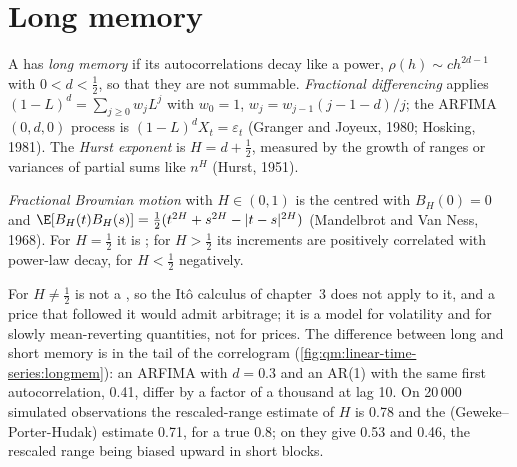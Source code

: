 \section{Long memory}

\begin{definition}\label{def:qm:linear-time-series:longmem}
A  has \emph{long memory} if its autocorrelations decay like a power, $\rho(h) \sim ch^{2d-1}$ with $0 < d < \frac12$, so
that they are not summable. \emph{Fractional differencing} applies $(1 - L)^d = \sum_{j \ge 0}w_jL^j$ with $w_0 = 1$, $w_j = w_{j-1}(j - 1 -
d)/j$; the ARFIMA$(0, d, 0)$ process is $(1 - L)^dX_t = \varepsilon_t$ (Granger and Joyeux, 1980; Hosking, 1981). The \emph{Hurst exponent} is
$H = d + \frac12$, measured by the growth of ranges or variances of partial sums like $n^H$ (Hurst, 1951).
\end{definition}

\begin{definition}\label{def:qm:linear-time-series:fbm}
\emph{Fractional Brownian motion} with  $H \in (0, 1)$ is the centred  with $B_H(0) = 0$ and
$\E[B_H(t)B_H(s)] = \frac12(t^{2H} + s^{2H} - |t - s|^{2H})$ (Mandelbrot and Van Ness, 1968). For $H = \frac12$ it is ; for $H > \frac12$ its increments
are positively correlated with power-law decay, for $H < \frac12$ negatively.
\end{definition}

For $H \ne \frac12$  is not a , so the Itô calculus of chapter~3 does not apply to it, and a price that followed it
would admit arbitrage; it is a model for volatility and for slowly mean-reverting quantities, not for prices. The difference between long and short
memory is in the tail of the correlogram (\cref{fig:qm:linear-time-series:longmem}): an ARFIMA with $d = 0.3$ and an AR(1) with the same first
autocorrelation, 0.41, differ by a factor of a thousand at lag 10. On 20\,000 simulated observations the rescaled-range estimate of $H$ is 0.78 and the
 (Geweke--Porter-Hudak) estimate 0.71, for a true 0.8; on  they give 0.53 and 0.46, the rescaled range being biased upward in short
blocks.

